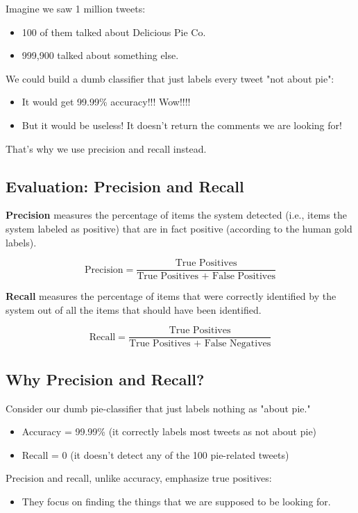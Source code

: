 Imagine we saw 1 million tweets:
\begin{itemize}
\item 100 of them talked about Delicious Pie Co.
\item 999,900 talked about something else.
\end{itemize}

We could build a dumb classifier that just labels every tweet "not about pie":
\begin{itemize}
\item It would get 99.99\% accuracy!!! Wow!!!!
\item But it would be useless! It doesn't return the comments we are looking for!
\end{itemize}

That's why we use precision and recall instead.

\subsection{Evaluation: Precision and Recall}
\textbf{Precision} measures the percentage of items the system detected (i.e., items the system labeled as positive) that are in fact positive (according to the human gold labels).

\[
\text{Precision} = \frac{\text{True Positives}}{\text{True Positives + False Positives}}
\]


\textbf{Recall} measures the percentage of items that were correctly identified by the system out of all the items that should have been identified.

\[
\text{Recall} = \frac{\text{True Positives}}{\text{True Positives + False Negatives}}
\]



\subsection{Why Precision and Recall?}
Consider our dumb pie-classifier that just labels nothing as "about pie."

\begin{itemize}
  \item Accuracy = 99.99\% (it correctly labels most tweets as not about pie)
  \item Recall = 0 (it doesn't detect any of the 100 pie-related tweets)
\end{itemize}

Precision and recall, unlike accuracy, emphasize true positives:
\begin{itemize}
  \item They focus on finding the things that we are supposed to be looking for.
\end{itemize}




